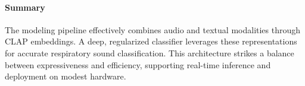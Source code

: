 \paragraph{Summary}
The modeling pipeline effectively combines audio and textual modalities through CLAP embeddings. A deep, regularized classifier leverages these representations for accurate respiratory sound classification. This architecture strikes a balance between expressiveness and efficiency, supporting real-time inference and deployment on modest hardware.
